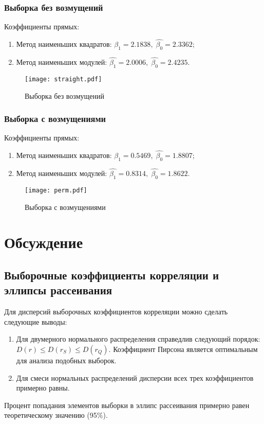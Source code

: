 \documentclass[a4paper,12pt]{article} %
\begin{document}
\subsubsection{Выборка без возмущений}
Коэффициенты прямых:
\begin{enumerate}
    \item Метод наименьших квадратов: $\hat{\beta_1}=2.1838,\;\hat{\beta_0}=2.3362$;
    \item Метод наименьших модулей: $\hat{\beta_1}=2.0006,\;\hat{\beta_0}=2.4235$.
\end{enumerate}
\begin{figure}[H]
    \centering
    \texttt{[image: straight.pdf]}
    \caption{Выборка без возмущений}
    \label{fig:straight}
\end{figure}
\subsubsection{Выборка с возмущениями}
Коэффициенты прямых:
\begin{enumerate}
    \item Метод наименьших квадратов: $\hat{\beta_1}=0.5469,\;\hat{\beta_0}=1.8807$;
    \item Метод наименьших модулей: $\hat{\beta_1}=0.8314,\;\hat{\beta_0}=1.8622$.
\end{enumerate}
\begin{figure}[H]
    \centering
    \texttt{[image: perm.pdf]}
    \caption{Выборка с возмущениями}
    \label{fig:perm}
\end{figure}
\section{Обсуждение}
\subsection{Выборочные коэффициенты корреляции и эллипсы рассеивания}
Для дисперсий выборочных коэффициентов корреляции можно сделать следующие выводы:
\begin{enumerate}
    \item Для двумерного нормального распределения справедлив следующий порядок: $D(r)\leq D(r_S)\leq D(r_Q)$. Коэффициент Пирсона является оптимальным для анализа подобных выборок. 
    \item Для смеси нормальных распределений дисперсии всех трех коэффициентов примерно равны.
\end{enumerate}
Процент попадания элементов выборки в эллипс рассеивания примерно равен теоретическому значению (95\%).
\end{document}
